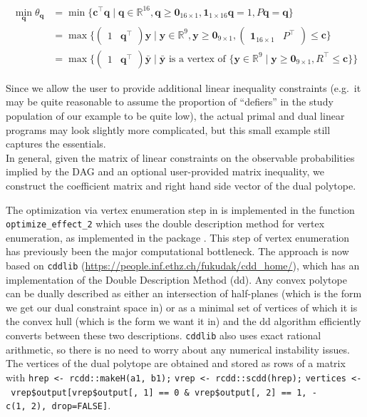 \begin{align*}
\min_\mathbf{q} \theta_\mathbf{q}
&=\min\{\mathbf{c}^\top\mathbf{q}\mid \mathbf{q}\in\mathbb{R}^{16},\mathbf{q}\geq\mathbf{0}_{16\times1},\mathbf{1}_{1\times 16} \mathbf{q}=1,P\mathbf{q}=\mathbf{q}\}\\
&=\max\{\begin{pmatrix}1&\mathbf{q}^\top\end{pmatrix}\mathbf{y}\mid\mathbf{y}\in\mathbb{R}^{9},\mathbf{y}\geq \mathbf{0}_{9\times 1},\begin{pmatrix}\mathbf{1}_{16\times 1}&P^\top\end{pmatrix}\leq\mathbf{c}\}\\
&=\max\{\begin{pmatrix}1&\mathbf{q}^\top\end{pmatrix}\bar{\mathbf{y}}\mid\bar{\mathbf{y}}\text{ is a vertex of }\{\mathbf{y}\in\mathbb{R}^{9}\mid \mathbf{y}\geq\mathbf{0}_{9\times 1},R^\top\leq\mathbf{c}\}\}
\end{align*}

Since we allow the user to provide additional linear inequality constraints (e.g.~it may be quite reasonable to assume the proportion of ``defiers'' in the study population of our example to be quite low), the actual primal and dual linear programs may look slightly more complicated, but this small example still captures the essentials.\\
In general, given the matrix of linear constraints on the observable probabilities implied by the DAG and an optional user-provided matrix inequality, we construct the coefficient matrix and right hand side vector of the dual polytope.

The optimization via vertex enumeration step in  is implemented in the function \texttt{optimize\_effect\_2} which uses the double description method for vertex enumeration, as implemented in the  package \citep{rcdd}. This step of vertex enumeration has previously been the major computational bottleneck. The approach is now based on \texttt{cddlib} (\url{https://people.inf.ethz.ch/fukudak/cdd_home/}), which has an implementation of the Double Description Method (dd).
Any convex polytope can be dually described as either an intersection of half-planes (which is the form we get our dual constraint space in) or as a minimal set of vertices of which it is the convex hull (which is the form we want it in) and the dd algorithm efficiently converts between these two descriptions. \texttt{cddlib} also uses exact rational arithmetic, so there is no need to worry about any numerical instability issues.
The vertices of the dual polytope are obtained and stored as rows of a matrix with \texttt{hrep\ \textless{}-\ rcdd::makeH(a1,\ b1);} \texttt{vrep\ \textless{}-\ rcdd::scdd(hrep);} \texttt{vertices\ \textless{}-\ vrep\$output{[}vrep\$output{[},\ 1{]}\ ==\ 0\ \&\ vrep\$output{[},\ 2{]}\ ==\ 1,\ -c(1,\ 2),\ drop=FALSE{]}}.

